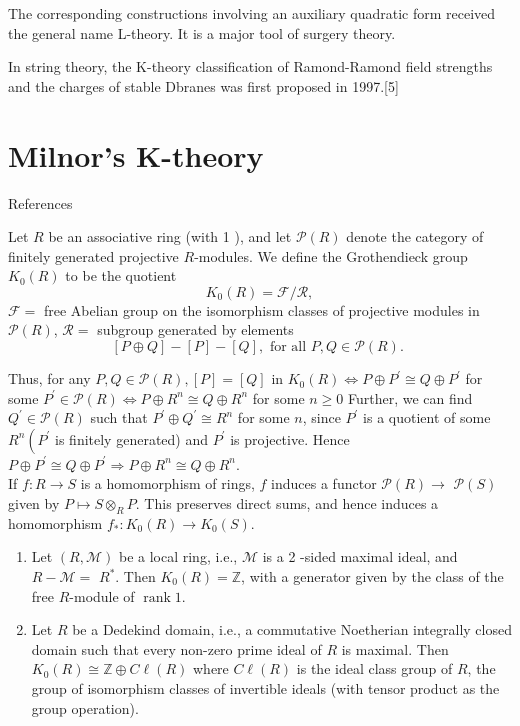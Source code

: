 The corresponding constructions involving an auxiliary quadratic form received the general name L-theory. It is a major tool of surgery theory.

In string theory, the K-theory classification of Ramond-Ramond field strengths and the charges of stable Dbranes was first proposed in 1997.[5]


\chapter{Milnor's K-theory}
References \cite{srinivasAlgebraicKTheory1996}

Let $R$ be an associative ring (with 1 ), and let $\mathcal{P}(R)$ denote the category of finitely generated projective $R$-modules. We define the Grothendieck group $K_0(R)$ to be the quotient
$$
K_0(R)=\mathcal{F} / \mathcal{R},
$$
$\mathcal{F}=$ free Abelian group on the isomorphism classes of projective modules in $\mathcal{P}(R)$,
$\mathcal{R}=$ subgroup generated by elements
$$
[P \oplus Q]-[P]-[Q], \text { for all } P, Q \in \mathcal{P}(R) \text {. }
$$

Thus, for any $P, Q \in \mathcal{P}(R),[P]=[Q]$ in $K_0(R) \Longleftrightarrow P \oplus P^{\prime} \cong Q \oplus P^{\prime}$ for some $P^{\prime} \in \mathcal{P}(R) \Longleftrightarrow P \oplus R^n \cong Q \oplus R^n$ for some $n \geq 0$ Further, we can find $Q^{\prime} \in \mathcal{P}(R)$ such that $P^{\prime} \oplus Q^{\prime} \cong R^n$ for some $n$, since $P^{\prime}$ is a quotient of some $R^n\left(P^{\prime}\right.$ is finitely generated) and $P^{\prime}$ is projective. Hence $P \oplus P^{\prime} \cong Q \oplus P^{\prime} \Longrightarrow P \oplus R^n \cong Q \oplus R^n$.\\
If $f: R \rightarrow S$ is a homomorphism of rings, $f$ induces a functor $\mathcal{P}(R) \rightarrow$ $\mathcal{P}(S)$ given by $P \longmapsto S \otimes_R P$. This preserves direct sums, and hence induces a homomorphism $f_*: K_0(R) \rightarrow K_0(S)$.

\begin{prop}
    \begin{enumerate}
        \item Let $(R, \mathcal{M})$ be a local ring, i.e., $\mathcal{M}$ is a 2 -sided maximal ideal, and $R-\mathcal{M}=$ $R^*$. Then $K_0(R)=\mathbb{Z}$, with a generator given by the class of the free $R$-module of $\operatorname{rank} 1$.
        \item Let $R$ be a Dedekind domain, i.e., a commutative Noetherian integrally closed domain such that every non-zero prime ideal of $R$ is maximal. Then $K_0(R) \cong \mathbb{Z} \oplus C \ell(R)$ where $C \ell(R)$ is the ideal class group of $R$, the group of isomorphism classes of invertible ideals (with tensor product as the group operation).
    \end{enumerate}
\end{prop}

